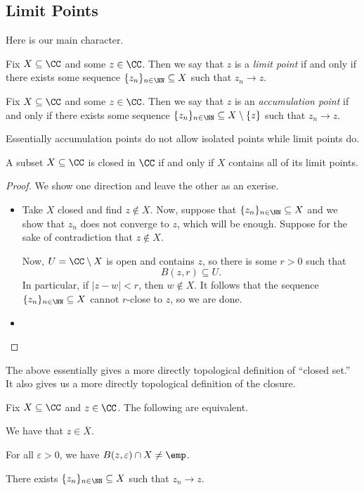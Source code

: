 \subsection{Limit Points}
Here is our main character.
\begin{definition}
	Fix $X\subseteq\CC$ and some $z\in\CC$. Then we say that $z$ is a \textit{limit point} if and only if there exists some sequence $\{z_n\}_{n\in\NN}\subseteq X$ such that $z_n\to z$.
\end{definition}
\begin{definition}
	Fix $X\subseteq\CC$ and some $z\in\CC$. Then we say that $z$ is an \textit{accumulation point} if and only if there exists some sequence $\{z_n\}_{n\in\NN}\subseteq X\setminus\{z\}$ such that $z_n\to z$.
\end{definition}
Essentially accumulation points do not allow isolated points while limit points do.
\begin{lemma}
	A subset $X\subseteq\CC$ is closed in $\CC$ if and only if $X$ contains all of its limit points.
\end{lemma}
\begin{proof}
	We show one direction and leave the other as an exerise.
	\begin{itemize}
		\item Take $X$ closed and find $z\notin X$. Now, suppose that $\{z_n\}_{n\in\NN}\subseteq X$ and we show that $z_n$ does not converge to $z$, which will be enough. Suppose for the sake of contradiction that $z\notin X$.

		Now, $U=\CC\setminus X$ is open and contains $z$, so there is some $r>0$ such that
		\[B(z,r)\subseteq U.\]
		In particular, if $|z-w|<r$, then $w\notin X$. It follows that the sequence $\{z_n\}_{n\in\NN}\subseteq X$ cannot $r$-close to $z$, so we are done.
		\item \todo{}
	\end{itemize}
\end{proof}
The above essentially gives a more directly topological definition of ``closed set.'' It also gives us a more directly topological definition of the closure.
\begin{lemma}
	Fix $X\subseteq\CC$ and $z\in\CC$. The following are equivalent.
	\begin{listalph}
		\item We have that $z\in\overline X$.
		\item For all $\varepsilon>0$, we have $B(z,\varepsilon)\cap X\ne\emp$.
		\item There exists $\{z_n\}_{n\in\NN}\subseteq X$ such that $z_n\to z$.
	\end{listalph}
\end{lemma}
